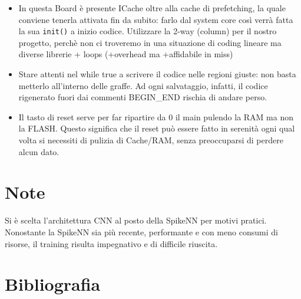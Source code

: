 \begin{itemize}
    \item In questa Board è presente ICache oltre alla cache di prefetching, la quale conviene tenerla attivata fin da subito: farlo dal system core così verrà fatta la sua \texttt{init()} a inizio codice. Utilizzare la 2-way (column) per il nostro progetto, perchè non ci troveremo in una situazione di coding lineare ma diverse librerie + loops (+overhead ma +affidabile in miss)
    \item Stare attenti nel while true a scrivere il codice nelle regioni giuste: non basta metterlo all'interno delle graffe. Ad ogni salvataggio, infatti, il codice rigenerato fuori dai commenti BEGIN\_END rischia di andare perso.
    \item Il tasto di reset serve per far ripartire da 0 il main pulendo la RAM ma non la FLASH. Questo significa che il reset può essere fatto in serenità ogni qual volta si necessiti di pulizia di Cache/RAM, senza preoccuparsi di perdere alcun dato.
\end{itemize}

\section*{Note}

Si è scelta l’architettura CNN al posto della SpikeNN per motivi pratici. Nonostante la SpikeNN sia più recente, performante e con meno consumi di risorse, il training risulta impegnativo e di difficile riuscita.

\section*{Bibliografia}

